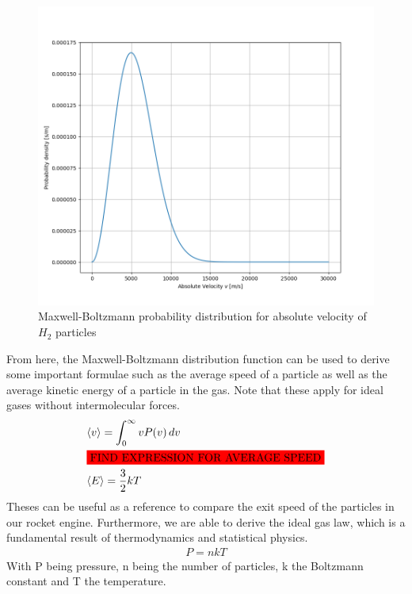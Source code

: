 \documentclass[reprint,english,notitlepage]{revtex4-2}
\begin{document}
\begin{figure}[h]
	\centering
	\includegraphics[scale=0.3]{./Figures/Max-Boltz3}
	\caption{Maxwell-Boltzmann probability distribution for absolute velocity of $H_{2}$ particles}\label{fig:Max_Boltz3D_Plot}
\end{figure}
From here, the Maxwell-Boltzmann distribution function can be used to derive some important formulae such as the average speed of a particle as well as the average kinetic energy of a particle in the gas.
Note that these apply for ideal gases without intermolecular forces.
\begin{align*}
    &\langle v \rangle = \int_{0}^{\infty} vP(v)\,dv\\
	&\colorbox{red}{FIND EXPRESSION FOR AVERAGE SPEED}\\
	&\langle E \rangle = \frac{3}{2}kT
\end{align*}
Theses can be useful as a reference to compare the exit speed of the particles in our rocket engine.
Furthermore, we are able to derive the ideal gas law, which is a fundamental result of thermodynamics and statistical physics.
\begin{align*}
    P = nkT
\end{align*}
With P being pressure, n being the number of particles, k the Boltzmann constant and T the temperature.\\
\end{document}
